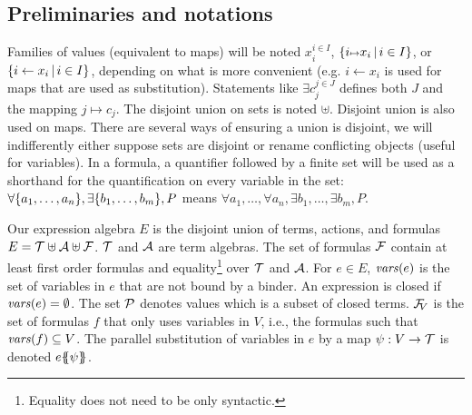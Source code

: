 \documentclass[runningheads]{llncs}
\begin{document}


\subsection{Preliminaries and notations}
Families of values (equivalent to maps) will be noted \(x_i^{i \in I}\), \(\mset{i \mapsto x_i}{i \in I}\), or \(\mset{i \gets x_i}{i \in I}\), depending on what is more convenient (e.g. $i \gets x_i$ is used for maps that are used as substitution). Statements like  $\exists c_j^{j \in J}$ defines both $J$ and the mapping ${j \mapsto c_j}$.
The disjoint union on sets is noted \(\uplus\).
Disjoint union is also used on maps.
There are several ways of ensuring a union is disjoint, we will indifferently either suppose sets are disjoint or rename conflicting objects (useful for variables).
In a formula, a quantifier followed by a finite set will be used as a shorthand for the quantification on every variable in the set:
\(\forall \mbrc{a_1, \dots, a_n}, \exists \mbrc{b_1, \dots, b_m}, P\) means \(\forall a_1, \dots, \forall a_n, \exists b_1, \dots, \exists b_m, P\).

Our expression algebra \(E\) is the disjoint union  of  terms,  actions, and  formulas
\( E=\terms \uplus \actions \uplus \formulas\).
\(\terms\) and \(\actions\) are term algebras.
The set of formulas \(\formulas\) contain at least first order formulas and equality\footnote{Equality does not need to be only syntactic.} over \(\terms\) and \(\actions\). 
For \(e \in E\),
 \(\fvars{e}\) is the set of variables in  $e$ that are not bound by a binder. 
An expression is closed if \(\fvars{e}=\emptyset\).
The set \(\values\) denotes values which is a subset of closed terms. \(\rformulas[V]\) is the set of formulas $f$ that only uses variables in $V$, i.e., the formulas such that  \(\fvars{f}\subseteq V\).
The parallel substitution of variables in \(e\) by a map \(\psi: V \to \terms\) is denoted \(e\psubst{\psi}\).
\end{document}
